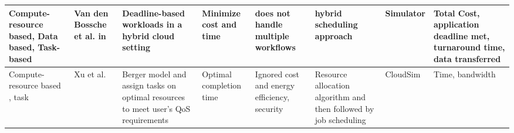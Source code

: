 \begin{sidewaystable*}[!htbp]
{\begin{tabular}{|g{2cm} p{1.9cm} p{2cm} p{2cm} p{2cm} p{2cm} p{2cm} p{2cm}|}
 Compute-resource based, Data based, Task-based & Van den Bossche et al. in~\cite{vandenbosshe2013} & Deadline-based workloads in a hybrid cloud setting & Minimize cost and time & does not handle multiple workflows & hybrid scheduling approach & Simulator & Total Cost, application deadline met, turnaround time, data transferred 
\\ \hline

Compute-resource based , task & Xu et al.~\cite{xu2011job} & Berger model and assign tasks on optimal resources to meet user's QoS requirements & Optimal completion time & Ignored cost and energy efficiency, security& Resource allocation algorithm and then followed by job scheduling & CloudSim & Time, bandwidth 
\\ \hline


\end{tabular}
}
\end{sidewaystable*}
